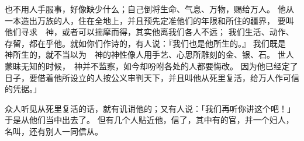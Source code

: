 {也不用人手服事，好像缺少什么；自己倒将生命、气息、万物，赐给万人。
他从一本造出万族的人，住在全地上，并且预先定准他们的年限和所住的疆界，
要叫他们寻求　神，或者可以揣摩而得，其实他离我们各人不远；
我们生活、动作、存留，都在乎他。就如你们作诗的，有人说：『我们也是他所生的。』
我们既是　神所生的，就不当以为　神的神性像人用手艺、心思所雕刻的金、银、石。
世人蒙昧无知的时候，　神并不监察，如今却吩咐各处的人都要悔改。
因为他已经定了日子，要借着他所设立的人按公义审判天下，并且叫他从死里复活，给万人作可信的凭据。」
\par }{\PP {}众人听见从死里复活的话，就有讥诮他的；又有人说：「我们再听你讲这个吧！」
于是{}从他们当中出去了。
但有几个人贴近他，信了{}，其中有{}的官{}，并一个妇人，名叫{}，还有别人一同信从。

}
